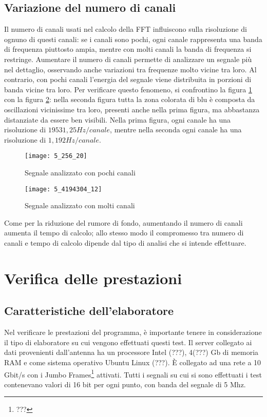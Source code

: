 \subsection{Variazione del numero di canali}
Il numero di canali usati nel calcolo della \ac{FFT} influiscono sulla
risoluzione di ognuno di questi canali: se i canali sono pochi, ogni canale
rappresenta una banda di frequenza piuttosto ampia, mentre con molti canali la
banda di frequenza si restringe. Aumentare il numero di canali permette di
analizzare un segnale pi\`u nel dettaglio, osservando anche variazioni tra
frequenze molto vicine tra loro. Al contrario, con pochi canali l'energia del
segnale viene distribuita in porzioni di banda vicine tra loro. Per verificare
questo fenomeno, si confrontino la figura \ref{fig:low_chans} con la figura
\ref{fig:high_chans}: nella seconda figura tutta la zona colorata di blu \`e
composta da oscillazioni vicinissime tra loro, presenti anche nella prima
figura, ma abbastanza distanziate da essere ben visibili. Nella prima figura,
ogni canale ha una risoluzione di $19531,25 Hz/canale$, mentre nella seconda
ogni canale ha una risoluzione di $1,192 Hz/canale$.
\begin{figure}[htb]
	\begin{center}
		\texttt{[image: 5\_256\_20]}
	\end{center}
	\caption{Segnale analizzato con pochi canali}
	\label{fig:low_chans}
\end{figure}

\begin{figure}[htb]
	\begin{center}
		\texttt{[image: 5\_4194304\_12]}
	\end{center}
	\caption{Segnale analizzato con molti canali}
	\label{fig:high_chans}
\end{figure}

Come per la riduzione del rumore di fondo, aumentando il numero di canali
aumenta il tempo di calcolo; allo stesso modo il compromesso tra numero di
canali e tempo di calcolo dipende dal tipo di analisi che si intende effettuare.

\section{Verifica delle prestazioni}
\subsection{Caratteristiche dell'elaboratore}
Nel verificare le prestazioni del programma, \`e importante tenere in
considerazione il tipo di elaboratore su cui vengono effettuati questi test. Il
server collegato ai dati provenienti dall'antenna ha un processore Intel (???),
4(???) Gb di memoria RAM e come sistema operativo Ubuntu Linux (???). \`E
collegato ad una rete a 10 Gbit/s con i Jumbo Frames\footnote{???} attivati.
Tutti i segnali su cui si sono effettuati i test contenevano valori di 16 bit
per ogni punto, con banda del segnale di 5 Mhz.
